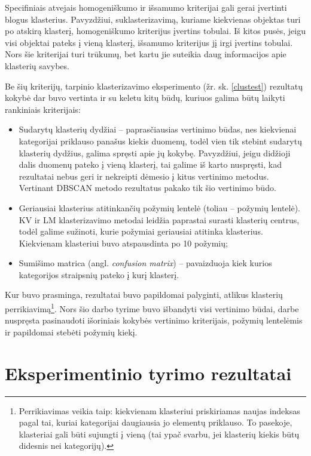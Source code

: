 \documentclass{VUMIFInfBakalaurinis}
\begin{document}
Specifiniais atvejais homogeniškumo ir išsamumo kriterijai gali gerai
įvertinti blogus klasterius. Pavyzdžiui, suklasterizavimą, kuriame
kiekvienas objektas turi po atskirą klasterį, homogeniškumo kriterijus
įvertins tobulai. Iš kitos pusės, jeigu visi objektai pateks į vieną
klasterį, išsamumo kriterijus jį irgi įvertins tobulai. Nors šie
kriterijai turi trūkumų, bet kartu jie suteikia daug informacijos apie
klasterių savybes.

Be šių kriterijų, tarpinio klasterizavimo eksperimento (žr. sk. \ref{clustest}) rezultatų kokybė dar buvo vertinta ir su keletu
kitų būdų, kuriuos galima būtų laikyti rankiniais kriterijais:

\begin{itemize}
\item
  Sudarytų klasterių dydžiai -- paprasčiausias vertinimo būdas, nes
  kiekvienai kategorijai priklauso panašus kiekis duomenų, todėl vien
  tik stebint sudarytų klasterių dydžius, galima spręsti apie jų kokybę.
  Pavyzdžiui, jeigu didžioji dalis duomenų pateko į vieną klasterį, tai
  galime iš karto nuspręsti, kad rezultatai nebus geri ir nekreipti
  dėmesio į kitus vertinimo metodus. Vertinant DBSCAN metodo rezultatus
  pakako tik šio vertinimo būdo.
\item
  Geriausiai klasterius atitinkančių požymių lentelė (toliau -- požymių
  lentelė). KV ir LM klasterizavimo metodai leidžia paprastai surasti
  klasterių centrus, todėl galime sužinoti, kurie požymiai geriausiai
  atitinka klasterius. Kiekvienam klasteriui buvo atspausdinta po 10
  požymių;
\item
  Sumišimo matrica (angl. \emph{confusion matrix}) -- pavaizduoja kiek
  kurios kategorijos straipsnių pateko į kurį klasterį.
\end{itemize}

Kur buvo prasminga, rezultatai buvo papildomai palyginti, atlikus
klasterių perrikiavimą\footnote{Perrikiavimas veikia taip: kiekvienam
  klasteriui priskiriamas naujas indeksas pagal tai, kuriai kategorijai
  daugiausia jo elementų priklauso. To pasekoje, klasteriai gali būti
  sujungti į vieną (tai ypač svarbu, jei klasterių kiekis būtų
  didesnis nei kategorijų).}. Nors šio darbo tyrime buvo išbandyti visi
vertinimo būdai, darbe nuspręsta pasinaudoti išoriniais kokybės vertinimo kriterijais,
požymių lentelėmis ir papildomai stebėti požymių kiekį.

\section{Eksperimentinio tyrimo rezultatai}
\end{document}
